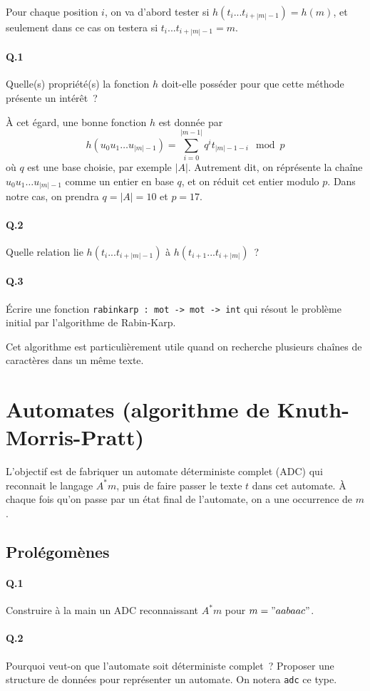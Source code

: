 \documentclass[10pt,a4paper]{article}
\begin{document}
Pour chaque position $i$, on va d'abord tester si $h(t_i...t_{i+|m|-1}) = h(m)$, et
seulement dans ce cas on testera si $t_i...t_{i+|m|-1} = m$.
\paragraph{Q.1} Quelle(s) propriété(s) la fonction $h$ doit-elle posséder pour 
que cette méthode présente un intérêt~?

À cet égard, une bonne fonction $h$ est donnée par
\[h(u_0u_1\dots u_{|m|-1}) = \sum_{i=0}^{|m-1|} q^i t_{|m|-1-i} \mod p\]
où $q$ est une base choisie, par exemple $|A|$. Autrement dit, on réprésente la
chaîne $u_0u_1\dots u_{|m|-1}$ comme un entier en base $q$, et on réduit cet 
entier modulo $p$. Dans notre cas, on prendra $q=|A|=10$ et $p=17$.
\paragraph{Q.2} Quelle relation lie $h(t_i...t_{i+|m|-1})$ 
à $h(t_{i+1}...t_{i+|m|})$~?
\paragraph{Q.3} Écrire une fonction \texttt{rabinkarp : mot -> mot -> int} qui 
résout le problème initial par l'algorithme de Rabin-Karp.

Cet algorithme est particulièrement utile quand on recherche plusieurs chaînes 
de caractères dans un même texte.
\section{Automates (algorithme de Knuth-Morris-Pratt)}
L'objectif est de fabriquer un automate déterministe complet (ADC) qui reconnait
le langage $A^* m$, puis de faire passer le texte $t$ dans cet automate. À 
chaque fois qu'on passe par un état final de l'automate, on a une occurrence de 
$m$.
\subsection{Prolégomènes}
\paragraph{Q.1} Construire à la main un ADC reconnaissant $A^* m$ pour $m="aabaac"$.
\paragraph{Q.2} Pourquoi veut-on que l'automate soit déterministe complet~? 
Proposer une structure de données pour représenter un automate. On notera 
\texttt{adc} ce type.
\end{document}
